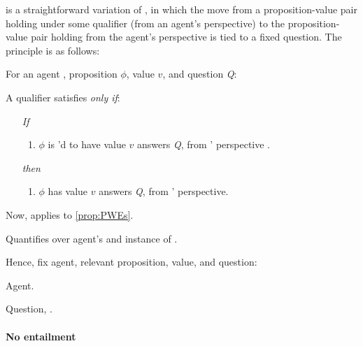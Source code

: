 \begin{note}
   is a straightforward variation of \ptivity{}, in which the move from a proposition-value pair holding under some qualifier (from an agent's perspective) to the proposition-value pair holding from the agent's perspective is tied to a fixed question.
  The principle is as follows:

  \begin{principle}[\ptivityQ{2}]
    \label{def:perspectivityQ}
    For an agent \vAgent{}, proposition \(\phi\), value \(v\), and question \emph{Q}:

    A qualifier \ptivityQV{} satisfies \ptivityQ{} \emph{only if}:

    \begin{enumerate}[noitemsep]
    \item[\emph{If}]
      \begin{enumerate}[label=\alph*., ref=(\alph*)]
      \item
        \(\phi\) is \ptivityQV{}'d to have value \(v\) answers \emph{Q}, from \vAgent{}' perspective .
      \end{enumerate}
    \item[\emph{then}]
      \begin{enumerate}[label=\alph*., ref=(\alph*), resume]
      \item
        \(\phi\) has value \(v\) answers \emph{Q}, from \vAgent{}' perspective.
      \end{enumerate}
    \end{enumerate}
    \vspace{-\baselineskip}
  \end{principle}
\end{note}

\begin{note}
  Now, applies to \autoref{prop:PWEs}.

  Quantifies over agent's and instance of \qzS{}.

  Hence, fix agent, relevant proposition, value, and question:

  Agent.

  Question, \qzS{}.
\end{note}

\paragraph{No entailment}

